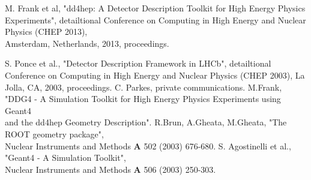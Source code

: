 \documentclass[10pt,a4paper]{article}
\begin{document}
\newpage
\begin{thebibliography}{9}
 M. Frank et al, "dd4hep: A Detector Description Toolkit 
                for High Energy Physics Experiments",
                detailtional Conference on Computing in High Energy and Nuclear Physics  
                (CHEP 2013), \\
                Amsterdam, Netherlands, 2013, proceedings.

 S. Ponce et al., 
                "Detector Description Framework in LHCb", 
                detailtional Conference on Computing in High Energy and Nuclear Physics  (CHEP 2003), 
                La Jolla, CA, 2003, proceedings. 
 C. Parkes, private communications.
 M.Frank, "DDG4 - A Simulation Toolkit for High Energy 
                Physics Experiments using Geant4 \\
                and the dd4hep Geometry Description".
 R.Brun, A.Gheata, M.Gheata, "The ROOT geometry package",\\
                    Nuclear Instruments and Methods {\bf{A}} 502 (2003) 676-680.
  S. Agostinelli et al., 
                   "Geant4 - A Simulation Toolkit", \\
                    Nuclear Instruments and Methods {\bf{A}} 506 (2003) 250-303.

\end{thebibliography}
\end{document}

